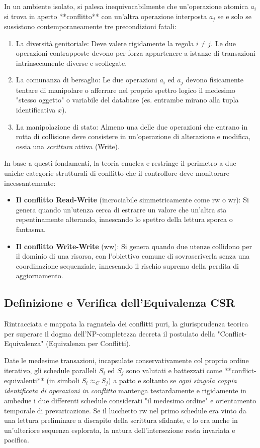 In un ambiente isolato, si palesa inequivocabilmente che un'operazione atomica $a_i$ si trova in aperto **conflitto** con un'altra operazione interposta $a_j$ se e solo se sussistono contemporaneamente tre precondizioni fatali:
\begin{enumerate}
    \item La diversità genitoriale: Deve valere rigidamente la regola $i \neq j$. Le due operazioni contrapposte devono per forza appartenere a istanze di transazioni intrinsecamente diverse e scollegate.
    \item La comunanza di bersaglio: Le due operazioni $a_i$ ed $a_j$ devono fisicamente tentare di manipolare o afferrare nel proprio spettro logico il medesimo "stesso oggetto" o variabile del database (es. entrambe mirano alla tupla identificativa $x$).
    \item La manipolazione di stato: Almeno una delle due operazioni che entrano in rotta di collisione deve consistere in un'operazione di alterazione e modifica, ossia una \textit{scrittura} attiva (Write).
\end{enumerate}

In base a questi fondamenti, la teoria enuclea e restringe il perimetro a due uniche categorie strutturali di conflitto che il controllore deve monitorare incessantemente:
\begin{itemize}
    \item \textbf{Il conflitto Read-Write} (incrociabile simmetricamente come rw o wr): Si genera quando un'utenza cerca di estrarre un valore che un'altra sta repentinamente alterando, innescando lo spettro della lettura sporca o fantasma.
    \item \textbf{Il conflitto Write-Write} (ww): Si genera quando due utenze collidono per il dominio di una risorsa, con l'obiettivo comune di sovrascriverla senza una coordinazione sequenziale, innescando il rischio supremo della perdita di aggiornamento.
\end{itemize}

\subsection{Definizione e Verifica dell'Equivalenza CSR}
Rintracciata e mappata la ragnatela dei conflitti puri, la giurisprudenza teorica per superare il dogma dell'NP-completezza decreta il postulato della "Conflict-Equivalenza" (Equivalenza per Conflitti).

Date le medesime transazioni, incapsulate conservativamente col proprio ordine iterativo, gli schedule paralleli $S_i$ ed $S_j$ sono valutati e battezzati come **conflict-equivalenti** (in simboli $S_i \approx_C S_j$) a patto e soltanto se \textit{ogni singola coppia identificata di operazioni in conflitto} mantenga testardamente e rigidamente in ambedue i due differenti schedule considerati "il medesimo ordine" e orientamento temporale di prevaricazione. Se il lucchetto rw nel primo schedule era vinto da una lettura preliminare a discapito della scrittura sfidante, e lo era anche in un'ulteriore sequenza esplorata, la natura dell'intersezione resta invariata e pacifica.

